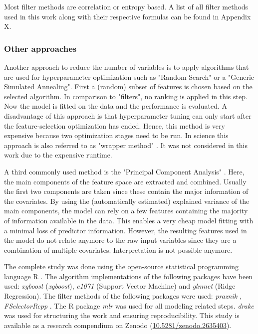 \documentclass[review]{elsarticle}
\begin{document}
Most filter methods are correlation or entropy based.
A list of all filter methods used in this work along with their respective formulas can be found in Appendix X.

\subsubsection{Other approaches}

\noindent Another approach to reduce the number of variables is to apply algorithms that are used for hyperparameter optimization such as "Random Search" or a "Generic Simulated Annealing".
First a (random) subset of features is chosen based on the selected algorithm.
In comparison to "filters", no ranking is applied in this step.
Now the model is fitted on the data and the performance is evaluated.
A disadvantage of this approach is that hyperparameter tuning can only start after the feature-selection optimization has ended.
Hence, this method is very expensive because two optimization stages need to be run.
In science this approach is also referred to as "wrapper method" \citep{chandrashekar2014, kohavi1997}.
It was not considered in this work due to the expensive runtime.

A third commonly used method is the "Principal Component Analysis" \citep{pearson1901, jolliffe2016}.
Here, the main components of the feature space are extracted and combined.
Usually the first two components are taken since these contain the major information of the covariates.
By using the (automatically estimated) explained variance of the main components, the model can rely on a few features containing the majority of information available in the data.
This enables a very cheap model fitting with a minimal loss of predictor information.
However, the resulting features used in the model do not relate anymore to the raw input variables since they are a combination of multiple covariates.
Interpretation is not possible anymore.

\noindent The complete study was done using the open-source statistical programming language R \citep{rcoreteam2018}.
The algorithm implementations of the following packages have been used: \textit{xgboost} \citep{chen2016} (\textit{xgboost}), \textit{e1071} \citep{e1071} (Support Vector Machine) and \textit{glmnet} \citep{glmnet} (Ridge Regression).
The filter methods of the following packages were used: \textit{praznik \citep{praznik}}, \textit{FSelectorRcpp} \citep{fselectorrcpp}.
The R package \textit{mlr} \citep{mlr} was used for all modeling related steps.
\textit{drake} was used for structuring the work and ensuring reproducibility.
This study is available as a research compendium on Zenodo (\url{10.5281/zenodo.2635403}).
\end{document}
